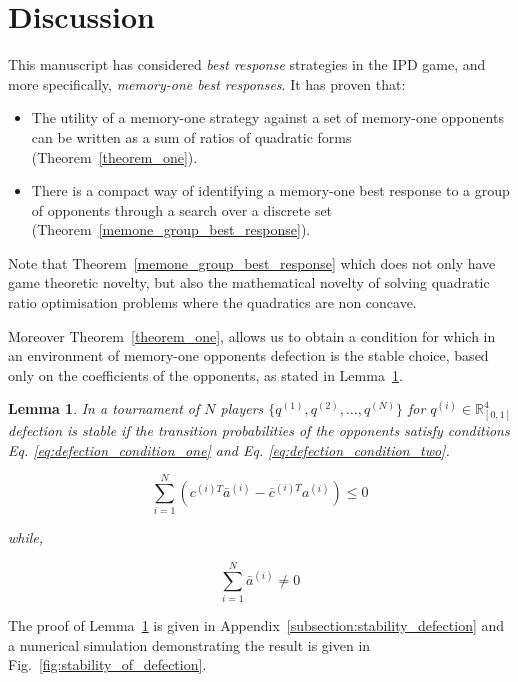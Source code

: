 \documentclass[10pt]{article}
\newcommand{\R}{\mathbb{R}}
\newtheorem{lemma}[theorem]{Lemma}
\begin{document}
\section{Discussion}
This manuscript has considered \textit{best response} strategies in the IPD game, and
more specifically, \textit{memory-one best responses}. It has proven that:

\begin{itemize}
    \item The utility
          of a memory-one strategy against a set of memory-one opponents can be written as a sum
          of ratios of quadratic forms (Theorem~\ref{theorem_one}).
    \item There is a compact way of identifying a memory-one best response to a
        group of opponents through a search over a discrete set
        (Theorem~\ref{memone_group_best_response}).
\end{itemize}

Note that Theorem~\ref{memone_group_best_response} which does not only have game theoretic
novelty, but also the mathematical novelty of solving quadratic ratio optimisation
problems where the quadratics are non concave.

Moreover Theorem~\ref{theorem_one}, allows us to
obtain a condition for which in an environment of memory-one opponents
defection is the stable choice, based only on the coefficients of the opponents,
as stated in Lemma~\ref{lemma:stability_of_defection}.

\begin{lemma}\label{lemma:stability_of_defection}
    In a tournament of \(N\) players \(\{q^{(1)}, q^{(2)}, \dots, q^{(N)} \}\)
    for \(q^{(i)} \in \R_{[0, 1]} ^ 4\)
    defection is stable if the transition probabilities of the
    opponents satisfy conditions Eq. \ref{eq:defection_condition_one} and Eq. \ref{eq:defection_condition_two}.

    \begin{equation}\label{eq:defection_condition_one}
        \sum_{i=1} ^ N (c^{(i)T} \bar{a}^{(i)} - \bar{c}^{(i)T} a^{(i)}) \leq 0
    \end{equation}

    while,

    \begin{equation}\label{eq:defection_condition_two}
        \sum_{i=1} ^ N \bar{a}^{(i)} \neq 0
    \end{equation}
\end{lemma}

The proof of Lemma~\ref{lemma:stability_of_defection} is given in
Appendix~\ref{subsection:stability_defection} and a numerical simulation
demonstrating the result is given
in Fig.~\ref{fig:stability_of_defection}.
\end{document}
